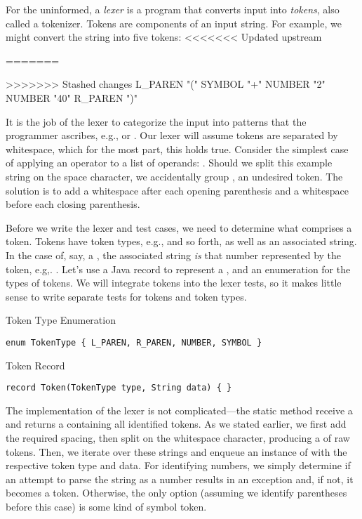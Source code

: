 \begin{verbnobox}[\footnotesize]
\begin{verbnobox}[\footnotesize]
\begin{verbnobox}[\footnotesize]
For the uninformed, a \textit{lexer} is a program that converts input into \textit{tokens}, also called a tokenizer. Tokens are components of an input string. For example, we might convert the string  into five tokens: 
<<<<<<< Updated upstream
\begin{verbnobox}[\footnotesize]
=======
\begin{verbnobox}[\small]
>>>>>>> Stashed changes
L_PAREN "("
SYMBOL "+"
NUMBER "2"
NUMBER "40"
R_PAREN ")"
\end{verbnobox}
It is the job of the lexer to categorize the input into patterns that the programmer ascribes, e.g.,  or . Our lexer will assume tokens are separated by whitespace, which for the most part, this holds true. Consider the simplest case of applying an operator to a list of operands: . Should we split this example string on the space character, we accidentally group , an undesired token. The solution is to add a whitespace after each opening parenthesis and a whitespace before each closing parenthesis. 

Before we write the lexer and test cases, we need to determine what comprises a token. Tokens have token types, e.g.,  and so forth, as well as an associated string. In the case of, say, a , the associated string \textit{is} that number represented by the token, e.g,. . Let's use a Java record to represent a , and an enumeration for the types of tokens. We will integrate tokens into the lexer tests, so it makes little sense to write separate tests for tokens and token types.

\begin{cl}{Token Type Enumeration}
\begin{lstlisting}[language=MyJava]
enum TokenType { L_PAREN, R_PAREN, NUMBER, SYMBOL }
\end{lstlisting}
\end{cl}

\begin{cl}{Token Record}
\begin{lstlisting}[language=MyJava]
record Token(TokenType type, String data) { }
\end{lstlisting}
\end{cl}

The implementation of the lexer is not complicated---the static  method receive a  and returns a  containing all identified tokens. As we stated earlier, we first add the required spacing, then split on the whitespace character, producing a  of raw tokens. Then, we iterate over these strings and enqueue an instance of  with the respective token type and data. For identifying numbers, we simply determine if an attempt to parse the string as a number results in an exception and, if not, it becomes a  token. Otherwise, the only option (assuming we identify parentheses before this case) is some kind of symbol token.


\end{verbnobox}
\end{verbnobox}
\end{verbnobox}
\end{verbnobox}
